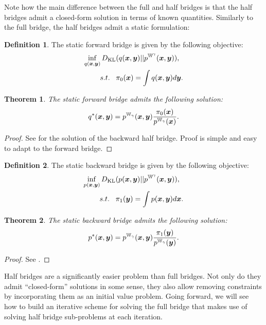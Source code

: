 \documentclass[a4paper,12pt,twoside,openright]{report}
\newtheorem{theorem}{Theorem}
\theoremstyle{definition}
\newtheorem{definition}{Definition}[section]
\begin{document}
Note how the main difference between the full and half bridges is that the half bridges admit a closed-form solution in terms of known quantities. Similarly to the full bridge, the half bridges admit a static formulation:

\begin{definition}
The static forward bridge is given by the following objective:
 \begin{align}\label{eq:static_bridge_forward}
        \inf_{q({\bm{x}},{\bm{y}})} D_{\mathrm{KL}}  &(q({\bm{x}},{\bm{y}}) || p^{\mathbb{W}^{\gamma}}({\bm{x}},{\bm{y}})), \nonumber \\
        s.t. \;\;\;& \pi_0({\bm{x}}) = \int q({\bm{x}},{\bm{y}}) d{\bm{y}}.
\end{align}
\end{definition}
\begin{theorem}\label{thrm:static_half_forward}
     The static forward bridge admits the following solution:
     \begin{align}
         q^{*}({\bm{x}},{\bm{y}}) = p^{\mathbb{W}_{\gamma}}({\bm{x}}, {\bm{y}})\frac{\pi_0({\bm{x}})}{p^{\mathbb{W}_{\gamma}}({\bm{x}})}.
     \end{align}
\end{theorem}
\begin{proof}
See \cite{pavon2018data} for the solution of the backward half bridge. Proof is simple and easy to adapt to the forward bridge. 
\end{proof}
\begin{definition}
The static backward bridge is given by the following objective:
 \begin{align}\label{eq:static_bridge_backward}
        \inf_{p({\bm{x}},{\bm{y}})} D_{\mathrm{KL}}  &(p({\bm{x}},{\bm{y}}) || p^{\mathbb{W}^{\gamma}}({\bm{x}},{\bm{y}})), \nonumber \\
        s.t. \;\;\;& \pi_1({\bm{y}}) = \int p({\bm{x}},{\bm{y}}) d{\bm{x}}. 
\end{align}
\end{definition}
\begin{theorem}\label{thrm:static_half_backward}
     The static backward bridge admits the following solution:
     \begin{align}
         p^{*}({\bm{x}},{\bm{y}}) = p^{\mathbb{W}_{\gamma}}({\bm{x}}, {\bm{y}})\frac{\pi_1({\bm{y}})}{p^{\mathbb{W}_{\gamma}}({\bm{y}})}.
     \end{align}
\end{theorem}
\begin{proof}
See \cite{pavon2018data}.
\end{proof}

Half bridges are a significantly easier problem than full bridges. Not only do they admit ``closed-form'' solutions in some sense, they also allow removing constraints by incorporating them as an initial value problem. Going forward, we will see how to build an iterative scheme for solving the full bridge that makes use of solving half bridge sub-problems at each iteration.
\end{document}
